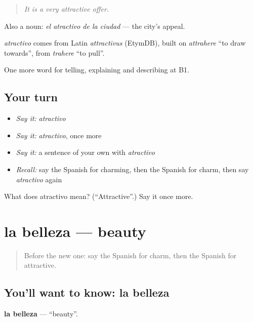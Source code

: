 \begin{quote}
\emph{It is a very attractive offer.}
\end{quote}

Also a noun: \emph{el atractivo de la ciudad} — the city's appeal.

\begin{cousinweb}
\emph{atractivo} comes from Latin \emph{attractīvus} (EtymDB), built on \emph{attrahere} \textquotedblleft{}to draw towards\textquotedblright{}, from \emph{trahere} \textquotedblleft{}to pull\textquotedblright{}.
\end{cousinweb}

\begin{grammarlens}[title={What you've built}]
One more word for telling, explaining and describing at B1.
\end{grammarlens}

\subsection*{Your turn}
\begin{itemize}
\raggedright
  \item \emph{Say it:} \emph{atractivo}
  \item \emph{Say it:} \emph{atractivo}, once more
  \item \emph{Say it:} a sentence of your own with \emph{atractivo}
  \item \emph{Recall:} say the Spanish for charming, then the Spanish for charm, then say \emph{atractivo} again
\end{itemize}

\begin{tcolorbox}[breakable,colback=teal!4,colframe=teal!35!black,title={Before you move on}]
What does atractivo mean? (\textquotedblleft{}Attractive\textquotedblright{}.) Say it once more.
\end{tcolorbox}
\section[la belleza]{la belleza — beauty}

\label{lesson:ES-C730-belleza}



\begin{quote}
Before the new one: say the Spanish for charm, then the Spanish for attractive.
\end{quote}

\subsection*{You'll want to know: la belleza}
\textbf{la belleza} — \textquotedblleft{}beauty\textquotedblright{}.

